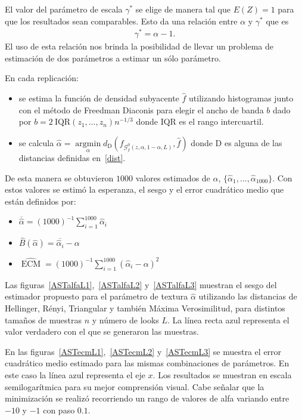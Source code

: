 El valor del parámetro de escala $\gamma^*$ se elige de manera tal que $E(Z)=1$ para que los resultados sean comparables. Esto da una relación entre  $\alpha$ y $\gamma^*$ que es 
\begin{align}
\label{Gama*}
\gamma^*=\alpha-1.
\end{align}
El uso de esta relación nos brinda la posibilidad de llevar un problema de estimación de dos parámetros a estimar un sólo parámetro. 


En cada replicación:
\begin{itemize}
	\item se estima la función de densidad subyacente $\widehat{f}$ utilizando histogramas junto con el método de Freedman Diaconis para elegir el ancho de banda $b$ dado por $b=2 \ \text{IQR}(z_1,\ldots,z_n) n^{-1/3}$ donde $\text{IQR}$ es el rango intercuartil.
	\item se calcula $\widehat{\alpha}= \mathop{\text{argmin}}\limits_{\alpha}d_{\text{D}}(f_{\mathcal{G}_I^0(z,\alpha,1-\alpha,L)},\widehat{f})$ donde D es alguna de las distancias definidas en~\ref{dist}.
\end{itemize} 

De esta manera se obtuvieron $1000$ valores estimados de $\alpha$, $\{\widehat{\alpha}_1, \dots, \widehat{\alpha}_{1000}\}$. Con estos valores se estimó la esperanza, el sesgo y el error cuadrático medio que están definidos por:

\begin{itemize}
	\item $\overline{\widehat{\alpha}}=(1000)^{-1}{\sum_{i=1}^{1000}{\widehat{\alpha}_i}}$
	\item $\widehat{B}(\widehat\alpha) = \overline{\widehat\alpha_i}- \alpha$
	\item $\widehat{\operatorname{\text{ECM}}}=({1000})^{-1}{\sum_{i=1}^{1000}{(\widehat{\alpha}_i-\alpha)^2}}$
\end{itemize}


Las figuras~\ref{ASTalfaL1},~\ref{ASTalfaL2} y~\ref{ASTalfaL3} muestran el sesgo del estimador propuesto para el parámetro de textura $\widehat{\alpha}$ utilizando las distancias de Hellinger, Rényi, Triangular y también Máxima Verosimilitud, para distintos tamaños de muestras $n$ y número de looks $L$. 
La línea recta azul representa el valor verdadero con el que se generaron las muestras. 

En las figuras~\ref{ASTecmL1},~\ref{ASTecmL2} y~\ref{ASTecmL3} se muestra el error cuadrático medio estimado para las mismas combinaciones de parámetros. En este caso la línea azul representa el eje $x$. Los resultados se muestran en escala semilogarítmica para su mejor comprensión visual.
Cabe señalar que la minimización se realizó recorriendo un rango de valores de alfa variando entre $-10$ y $-1$ con paso  $0.1$. 

